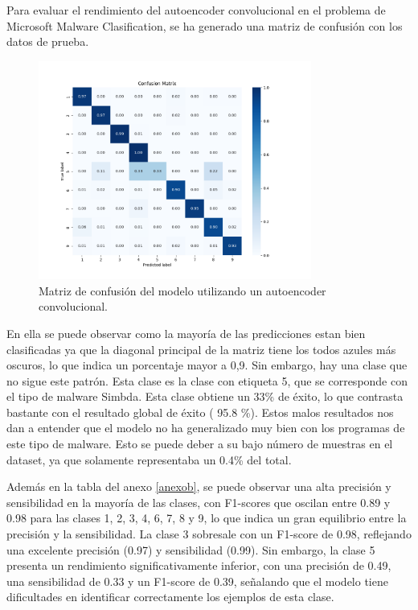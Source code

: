 Para evaluar el rendimiento del autoencoder convolucional en el problema de Microsoft Malware Clasification, se ha generado una matriz de confusión con los datos de prueba. 


\begin{figure}[H]
    \centering
    \includegraphics[width=0.8\textwidth]{img/confusionMatrixCAENorm1.png}
    \caption{Matriz de confusión del modelo utilizando un autoencoder convolucional.}
    \label{fig: caeConfusionMatrix}
\end{figure}


En ella se puede observar como la mayoría de las predicciones estan bien clasificadas ya que la diagonal principal de la matriz tiene los todos azules más oscuros, lo que indica un porcentaje mayor a 0,9. Sin embargo, hay una clase que no sigue este patrón. Esta clase es la clase con etiqueta 5, que se corresponde con el tipo de malware Simbda. Esta clase obtiene un 33\% de éxito, lo que contrasta bastante con el resultado global de éxito ( 95.8 \%). Estos malos resultados nos dan a entender que el modelo no ha generalizado muy bien con los programas de este tipo de malware. Esto se puede deber a su bajo número de muestras en el dataset, ya que solamente representaba un 0.4\% del total.
 
Además en la tabla del anexo \ref{anexob}, se puede observar una alta precisión y sensibilidad en la mayoría de las clases, con F1-scores que oscilan entre 0.89 y 0.98 para las clases 1, 2, 3, 4, 6, 7, 8 y 9, lo que indica un gran equilibrio entre la precisión y la sensibilidad. La clase 3 sobresale con un F1-score de 0.98, reflejando una excelente precisión (0.97) y sensibilidad (0.99). Sin embargo, la clase 5 presenta un rendimiento significativamente inferior, con una precisión de 0.49, una sensibilidad de 0.33 y un F1-score de 0.39, señalando que el modelo tiene dificultades en identificar correctamente los ejemplos de esta clase. 

